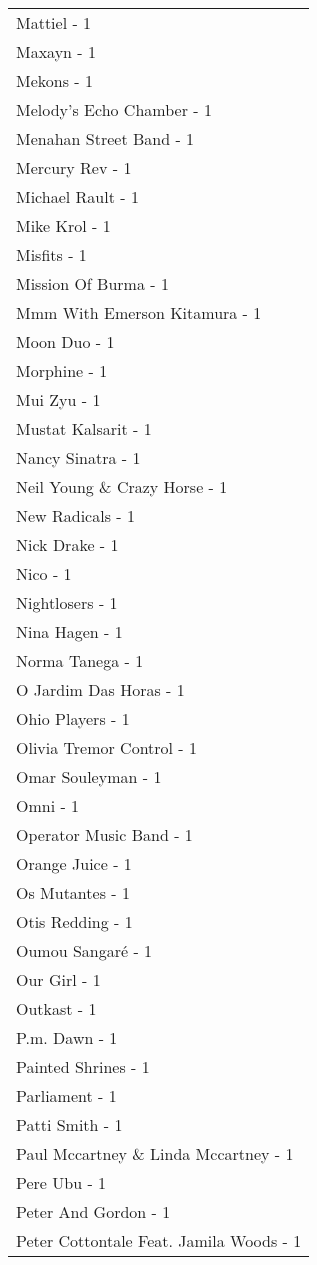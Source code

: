 \documentclass[
]{article}
\begin{document}
\begin{longtable}{l}
Mattiel - 1 \\ 
Maxayn - 1 \\ 
Mekons - 1 \\ 
Melody's Echo Chamber - 1 \\ 
Menahan Street Band - 1 \\ 
Mercury Rev - 1 \\ 
Michael Rault - 1 \\ 
Mike Krol - 1 \\ 
Misfits - 1 \\ 
Mission Of Burma - 1 \\ 
Mmm With Emerson Kitamura - 1 \\ 
Moon Duo - 1 \\ 
Morphine - 1 \\ 
Mui Zyu - 1 \\ 
Mustat Kalsarit - 1 \\ 
Nancy Sinatra - 1 \\ 
Neil Young \& Crazy Horse - 1 \\ 
New Radicals - 1 \\ 
Nick Drake - 1 \\ 
Nico - 1 \\ 
Nightlosers - 1 \\ 
Nina Hagen - 1 \\ 
Norma Tanega - 1 \\ 
O Jardim Das Horas - 1 \\ 
Ohio Players - 1 \\ 
Olivia Tremor Control - 1 \\ 
Omar Souleyman - 1 \\ 
Omni - 1 \\ 
Operator Music Band - 1 \\ 
Orange Juice - 1 \\ 
Os Mutantes - 1 \\ 
Otis Redding - 1 \\ 
Oumou Sangaré - 1 \\ 
Our Girl - 1 \\ 
Outkast - 1 \\ 
P.m. Dawn - 1 \\ 
Painted Shrines - 1 \\ 
Parliament - 1 \\ 
Patti Smith - 1 \\ 
Paul Mccartney \& Linda Mccartney - 1 \\ 
Pere Ubu - 1 \\ 
Peter And Gordon - 1 \\ 
Peter Cottontale Feat. Jamila Woods - 1 \\ 

\end{longtable}
\end{document}

